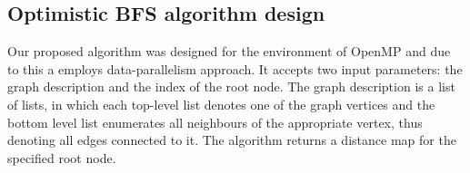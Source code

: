 \documentclass[letterpaper]{article}
\begin{document}
		
		
		
				
			
		\subsection{Optimistic BFS algorithm design}
			Our proposed algorithm was designed for the environment of OpenMP and due to this a employs data-parallelism approach. 
			It accepts two input parameters: the graph description and the index of the root node.
			The graph description is a list of lists, in which each top-level list denotes one of the graph vertices and the bottom level list enumerates all neighbours of the appropriate vertex, thus denoting all edges connected to it.
			The algorithm returns a distance map for the specified root node.
			
\end{document}
